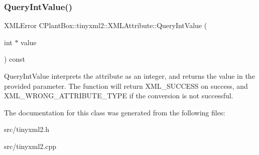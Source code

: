 \subsubsection{\texorpdfstring{Query\+Int\+Value()}{QueryIntValue()}}
{\footnotesize\ttfamily X\+M\+L\+Error C\+Plant\+Box\+::tinyxml2\+::\+X\+M\+L\+Attribute\+::\+Query\+Int\+Value (\begin{DoxyParamCaption}\item[{int $\ast$}]{value }\end{DoxyParamCaption}) const}

Query\+Int\+Value interprets the attribute as an integer, and returns the value in the provided parameter. The function will return X\+M\+L\+\_\+\+S\+U\+C\+C\+E\+SS on success, and X\+M\+L\+\_\+\+W\+R\+O\+N\+G\+\_\+\+A\+T\+T\+R\+I\+B\+U\+T\+E\+\_\+\+T\+Y\+PE if the conversion is not successful. 

The documentation for this class was generated from the following files\+:\begin{DoxyCompactItemize}
\item 
src/tinyxml2.\+h\item 
src/tinyxml2.\+cpp\end{DoxyCompactItemize}
